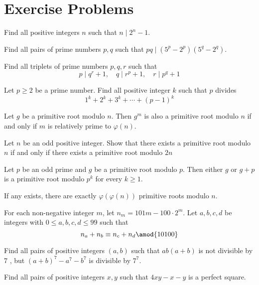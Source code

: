 \documentclass[11pt]{scrartcl}
\begin{document}
\section{Exercise Problems}
\begin{problem}
Find all positive integers \(n\) such that \(n \mid 2^n -1\).
\end{problem}
\begin{problem}
Find all pairs of prime numbers \(p,q\) such that \(pq \mid (5^p-2^p)(5^q-2^q)\).
\end{problem}
\begin{problem}
Find all triplets of prime numbers \(p,q,r\) such that
\[p \mid q^r+1 , \quad q\mid r^p +1 , \quad r \mid p^q+1\]
\end{problem}
\begin{problem}
Let \(p\ge2\) be a prime number. Find all positive integer \(k\) such that \(p\) divides
\[1^k + 2^k + 3^k +\cdots +(p-1)^k\]
\end{problem}
\begin{problem}
Let \(g\) be a primitive root modulo \(n\). Then \(g^m\) is also a primitive root modulo \(n\) if and only if \(m\) is relatively prime to \(\varphi(n)\).
\end{problem}
\begin{problem}
Let \(n\) be an odd positive integer. Show that there exists a primitive root modulo \(n\) if and only if there exists a primitive root modulo \(2n\)
\end{problem}
\begin{problem}
Let \(p\) be an odd prime and \(g\) be a primitive root modulo \(p\). Then either \(g\) or \(g+p\) is a primitive root modulo \(p^k\) for every \(k\ge 1\).
\end{problem}
\begin{problem}
If any exists, there are exactly \(\varphi(\varphi(n))\) primitive roots modulo \(n\).
\end{problem}
\begin{problem}
For each non-negative integer \(m\), let \(n_{m}=101 m-100 \cdot 2^{m} \). Let \(a, b, c, d\) be integers with \(0 \leq a, b, c, d \leq 99\) such that \[n_{a}+n_{b} \equiv n_{c}+n_{d} \amod{10100}\]
\end{problem}
\begin{problem}
Find all pairs of positive integers \((a, b)\) such that \(a b(a+b)\) is not divisible by 7 , but \((a+b)^{7}-a^{7}-b^{7}\) is divisible by \(7^{7}\).
\end{problem}
\begin{problem}
Find all pairs of positive integers \(x,y\) such that \(4xy-x-y\) is a perfect square.
\end{problem}
\end{document}
